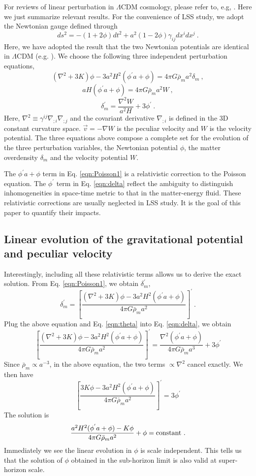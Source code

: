 \documentclass[aps,prl,showpacs,nobibnotes,twocolumn,
nobalancelastpage,superscriptaddress]{revtex4}
\newcommand{\be}{\begin{equation}}
\newcommand{\ee}{\end{equation}}
\begin{document}
For reviews of linear perturbation in $\Lambda$CDM cosmology, please refer
to, e.g, \cite{Kodama84,Ma95,Bertschinger01}. Here we just summarize relevant
results.  For the convenience of LSS study, we adopt the Newtonian gauge
defined through 
\be
ds^2=-(1+2\phi)dt^2+a^2(1-2\phi)\gamma_{ij}dx^idx^j\ .
\ee
 Here, we have adopted
the result that the two Newtonian potentials are identical in $\Lambda$CDM
(e.g. \cite{Ma95}).  We choose the following three independent perturbation
equations,  
\be
\label{eqn:Poisson1}
(\nabla^2+3K)\phi-3a^2H^2(\phi^{'}a+\phi)=4\pi G\bar{\rho}_ma^2\delta_m\ ,
\ee
\be
\label{eqn:theta}
aH(\phi^{'}a+\phi)=4\pi G\bar{\rho}_m a^2W\ ,
\ee
\be
\label{eqn:delta}
\delta^{'}_m=\frac{\nabla^2W}{a^2H}+3\phi^{'}\ .
\ee
Here, $\nabla^2\equiv \gamma^{ij}\nabla_{;i}\nabla_{;j}$ and the covariant
derivative $\nabla_{;i}$ is defined in the 3D constant curvature space. $\vec{v}=-\nabla W$
is the peculiar velocity and $W$ is the velocity potential.  The three
equations above compose a complete set for the evolution of the three perturbation
variables, the Newtonian potential $\phi$, the matter overdensity $\delta_m$
and the velocity potential $W$.   

The $\phi^{'}a+\phi$ term in
Eq. \ref{eqn:Poisson1} is a relativistic correction to the Poisson equation. 
The $\phi^{'}$ term in Eq. \ref{eqn:delta} reflect the ambiguity to
distinguish inhomogeneities in space-time metric to that in the matter-energy
fluid. These relativistic corrections are usually neglected in LSS study. It
is the goal of this paper to quantify their impacts. 

\subsection{Linear evolution of the gravitational potential and peculiar velocity}
Interestingly, including all these relativistic terms allows us to
derive the exact solution. From Eq. \ref{eqn:Poisson1}, we obtain $\delta^{'}_m$,
\be
\delta^{'}_m=\left[\frac{(\nabla^2+3K)\phi-3a^2H^2(\phi^{'}a+\phi)}{4\pi
    G\bar{\rho}_ma^2}\right]^{'}\ .
\ee
Plug the above equation and Eq. \ref{eqn:theta} into Eq. \ref{eqn:delta}, we
obtain
\be
\left[\frac{(\nabla^2+3K)\phi-3a^2H^2(\phi^{'}a+\phi)}{4\pi G\bar{\rho}_ma^2}\right]^{'}=\frac{\nabla^2(\phi^{'}a+\phi)}{4\pi
  G\bar{\rho}_m a^3}+3\phi^{'}
\ee
Since $\bar{\rho}_m\propto a^{-3}$, in the above equation, the two terms
$\propto \nabla^2$ cancel exactly. We then have
\be
\left[\frac{3K\phi-3a^2H^2(\phi^{'}a+\phi)}{4\pi
    G\bar{\rho}_ma^2}\right]^{'}=3\phi^{'}
\ee
The solution is
\be
\label{eqn:phiK}
\frac{a^2H^2(\phi^{'}a+\phi)-K\phi}{4\pi G\bar{\rho}_ma^2}+\phi={\rm constant}\ .
\ee
Immediately we see the linear evolution in $\phi$ is scale independent. This
tells us that the solution of $\phi$ obtained in the sub-horizon limit is also
valid at super-horizon scale. 
\end{document}

